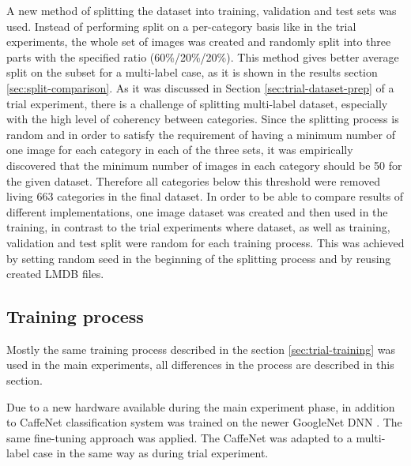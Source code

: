     A new method of splitting the dataset into training, validation and test sets was used. Instead of performing split on a per-category basis like in the trial experiments, the whole set of images was created and randomly split into three parts with the specified ratio (60\%/20\%/20\%). This method gives better average split on the subset for a multi-label case, as it is shown in the results section \ref{sec:split-comparison}. As it was discussed in Section \ref{sec:trial-dataset-prep} of a trial experiment, there is a challenge of splitting multi-label dataset, especially with the high level of coherency between categories. Since the splitting process is random and in order to satisfy the requirement of having a minimum number of one image for each category in each of the three sets, it was empirically discovered that the minimum number of images in each category should be 50 for the given dataset. Therefore all categories below this threshold were removed living 663 categories in the final dataset. In order to be able to compare results of different implementations, one image dataset was created and then used in the training, in contrast to the trial experiments where dataset, as well as training, validation and test split were random for each training process. This was achieved by setting random seed in the beginning of the splitting process and by reusing created LMDB files.
    
    
    
    \subsection{Training process}
    \label{sec:main-training}
    Mostly the same training process described in the section \ref{sec:trial-training} was used in the main experiments, all differences in the process are described in this section. 
    
    Due to a new hardware available during the main experiment phase, in addition to CaffeNet classification system was trained on the newer GoogleNet DNN \cite{Szegedy2015GoingDeeper}. The same fine-tuning approach was applied. The CaffeNet was adapted to a multi-label case in the same way as during trial experiment.
    
